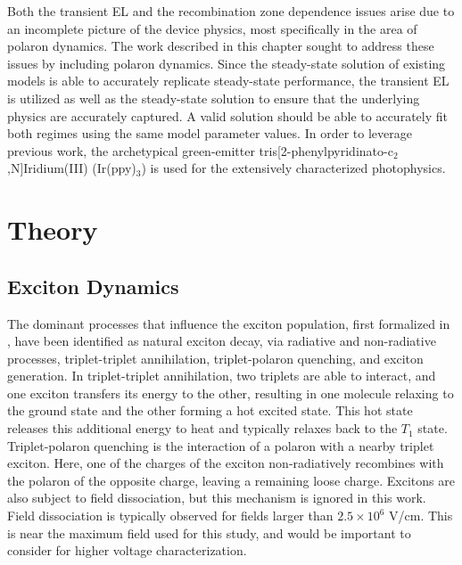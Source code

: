 \documentclass[../thesis.tex]{subfiles}
\begin{document}
Both the transient EL and the recombination zone dependence issues arise due to an incomplete picture of the device physics, most specifically in the area of polaron dynamics.  
The work described in this chapter sought to address these issues by including polaron dynamics.  
Since the steady-state solution of existing models is able to accurately replicate steady-state performance, the transient EL is utilized as well as the steady-state solution to ensure that the underlying physics are accurately captured.
A valid solution should be able to accurately fit both regimes using the same model parameter values.
In order to leverage previous work, the archetypical green-emitter tris[2-phenylpyridinato-c$_2$,N]Iridium(III) (Ir(ppy)$_3$) is used for the extensively characterized photophysics.\supercite{Baldo2000,Baldo2000a,Tsuboi2006,Adachi2001a,Kawamura2006,Kawamura2005c}

\section{Theory}
\subsection{Exciton Dynamics}
The dominant processes that influence the exciton population, first formalized in \textcite{Baldo2000a}, have been identified as natural exciton decay, via radiative and non-radiative processes, triplet-triplet annihilation, triplet-polaron quenching, and exciton generation.\supercite{Erickson2014,Song2010}
In triplet-triplet annihilation, two triplets are able to interact, and one exciton transfers its energy to the other, resulting in one molecule relaxing to the ground state and the other forming a hot excited state.
This hot state releases this additional energy to heat and typically relaxes back to the $T_1$ state.  
Triplet-polaron quenching is the interaction of a polaron with a nearby triplet exciton.
Here, one of the charges of the exciton non-radiatively recombines with the polaron of the opposite charge, leaving a remaining loose charge.
Excitons are also subject to field dissociation, but this mechanism is ignored in this work.
Field dissociation is typically observed for fields larger than $2.5 \times 10^6$ V/cm.\supercite{Reineke2007}
This is near the maximum field used for this study, and would be important to consider for higher voltage characterization.
\end{document}
